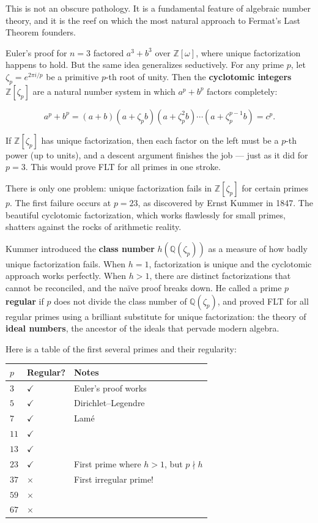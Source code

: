 This is not an obscure pathology. It is a fundamental feature of algebraic number theory, and it is the reef on which the most natural approach to Fermat's Last Theorem founders.

Euler's proof for $n = 3$ factored $a^3 + b^3$ over $\mathbb{Z}[\omega]$, where unique factorization happens to hold. But the same idea generalizes seductively. For any prime $p$, let $\zeta_p = e^{2\pi i/p}$ be a primitive $p$-th root of unity. Then the \textbf{cyclotomic integers} $\mathbb{Z}[\zeta_p]$ are a natural number system in which $a^p + b^p$ factors completely:

\[
a^p + b^p = (a + b)(a + \zeta_p b)(a + \zeta_p^2 b) \cdots (a + \zeta_p^{p-1} b) = c^p.
\]

If $\mathbb{Z}[\zeta_p]$ has unique factorization, then each factor on the left must be a $p$-th power (up to units), and a descent argument finishes the job --- just as it did for $p = 3$. This would prove FLT for all primes in one stroke.

There is only one problem: unique factorization fails in $\mathbb{Z}[\zeta_p]$ for certain primes $p$. The first failure occurs at $p = 23$, as discovered by Ernst Kummer in 1847. The beautiful cyclotomic factorization, which works flawlessly for small primes, shatters against the rocks of arithmetic reality.

Kummer introduced the \textbf{class number} $h(\mathbb{Q}(\zeta_p))$ as a measure of how badly unique factorization fails. When $h = 1$, factorization is unique and the cyclotomic approach works perfectly. When $h > 1$, there are distinct factorizations that cannot be reconciled, and the na\"ive proof breaks down. He called a prime $p$ \textbf{regular} if $p$ does not divide the class number of $\mathbb{Q}(\zeta_p)$, and proved FLT for all regular primes using a brilliant substitute for unique factorization: the theory of \textbf{ideal numbers}, the ancestor of the ideals that pervade modern algebra.

Here is a table of the first several primes and their regularity:

\begin{center}
\small
\begin{tabular}{lll}
\toprule
$p$ & Regular? & Notes \\
\midrule
$3$ & $\checkmark$ & Euler's proof works \\
$5$ & $\checkmark$ & Dirichlet–Legendre \\
$7$ & $\checkmark$ & Lamé \\
$11$ & $\checkmark$ &  \\
$13$ & $\checkmark$ &  \\
$23$ & $\checkmark$ & First prime where $h > 1$, but $p \nmid h$ \\
$37$ & $\times$ & First irregular prime! \\
$59$ & $\times$ &  \\
$67$ & $\times$ &  \\
\bottomrule
\end{tabular}
\end{center}


